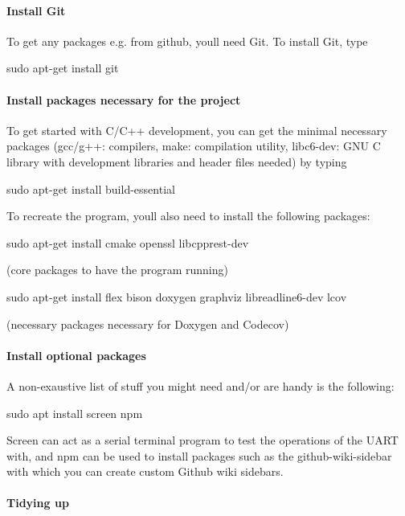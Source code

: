 \paragraph*{Install Git}

To get any packages e.\+g. from github, you\textquotesingle{}ll need Git. To install Git, type 
\begin{DoxyCode}
sudo apt-get install git
\end{DoxyCode}


\paragraph*{Install packages necessary for the project}

To get started with C/\+C++ development, you can get the minimal necessary packages (gcc/g++\+: compilers, make\+: compilation utility, libc6-\/dev\+: G\+NU C library with development libraries and header files needed) by typing 
\begin{DoxyCode}
sudo apt-get install build-essential
\end{DoxyCode}
 To recreate the program, you\textquotesingle{}ll also need to install the following packages\+: 
\begin{DoxyCode}
sudo apt-get install cmake openssl libcpprest-dev
\end{DoxyCode}
 (core packages to have the program running) 
\begin{DoxyCode}
sudo apt-get install flex bison doxygen graphviz libreadline6-dev lcov
\end{DoxyCode}
 (necessary packages necessary for Doxygen and Codecov)

\paragraph*{Install optional packages}

A non-\/exaustive list of stuff you might need and/or are handy is the following\+: 
\begin{DoxyCode}
sudo apt install screen npm
\end{DoxyCode}
 Screen can act as a serial terminal program to test the operations of the U\+A\+RT with, and npm can be used to install packages such as the github-\/wiki-\/sidebar with which you can create custom Github wiki sidebars. \paragraph*{Tidying up}

